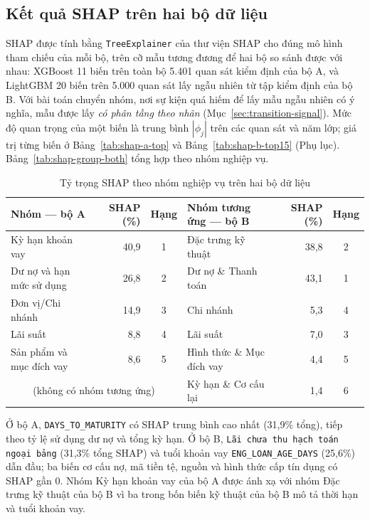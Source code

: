 \subsection{Kết quả SHAP trên hai bộ dữ liệu}
\label{sec:shap-b}

SHAP được tính bằng \mbox{\texttt{TreeExplainer}} \cite{lundberg2020tree} của thư viện SHAP \cite{shap_docs} cho đúng mô hình tham chiếu của mỗi bộ, trên cỡ mẫu tương đương để hai bộ so sánh được với nhau: XGBoost 11 biến trên toàn bộ 5.401 quan sát kiểm định của bộ A, và LightGBM 20 biến trên 5.000 quan sát lấy ngẫu nhiên từ tập kiểm định của bộ B. Với bài toán chuyển nhóm, nơi sự kiện quá hiếm để lấy mẫu ngẫu nhiên có ý nghĩa, mẫu được lấy \emph{có phân tầng theo nhãn} (Mục~\ref{sec:transition-signal}). Mức độ quan trọng của một biến là trung bình $|\phi_j|$ trên các quan sát và năm lớp; giá trị từng biến ở Bảng~\ref{tab:shap-a-top} và Bảng~\ref{tab:shap-b-top15} (Phụ lục). Bảng~\ref{tab:shap-group-both} tổng hợp theo nhóm nghiệp vụ.

\begin{table}[H]
\centering
\caption{Tỷ trọng SHAP theo nhóm nghiệp vụ trên hai bộ dữ liệu}
\label{tab:shap-group-both}
\label{tab:shap-a-group}
\label{tab:shap-b-group}
\begin{tabular}{|l|r|c||l|r|c|}
\hline
Nhóm --- bộ A & SHAP (\%) & Hạng & Nhóm tương ứng --- bộ B & SHAP (\%) & Hạng\\
\hline
Kỳ hạn khoản vay & 40,9 & 1 & Đặc trưng kỹ thuật & 38,8 & 2\\
Dư nợ và hạn mức sử dụng & 26,8 & 2 & Dư nợ \& Thanh toán & 43,1 & 1\\
Đơn vị/Chi nhánh & 14,9 & 3 & Chi nhánh & 5,3 & 4\\
Lãi suất & 8,8 & 4 & Lãi suất & 7,0 & 3\\
Sản phẩm và mục đích vay & 8,6 & 5 & Hình thức \& Mục đích vay & 4,4 & 5\\
\hline
\multicolumn{3}{|c||}{(không có nhóm tương ứng)} & Kỳ hạn \& Cơ cấu lại & 1,4 & 6\\
\hline
\end{tabular}
\end{table}

Ở bộ A, \mbox{\texttt{DAYS\_TO\_MATURITY}} có SHAP trung bình cao nhất (31,9\% tổng), tiếp theo tỷ lệ sử dụng dư nợ và tổng kỳ hạn. Ở bộ B, \texttt{Lãi chưa thu hạch toán ngoại bảng} (31,3\% tổng SHAP) và tuổi khoản vay \mbox{\texttt{ENG\_LOAN\_AGE\_DAYS}} (25,6\%) dẫn đầu; ba biến cơ cấu nợ, mã tiền tệ, nguồn và hình thức cấp tín dụng có SHAP gần 0. Nhóm Kỳ hạn khoản vay của bộ A được ánh xạ với nhóm Đặc trưng kỹ thuật của bộ B vì ba trong bốn biến kỹ thuật của bộ B mô tả thời hạn và tuổi khoản vay.

